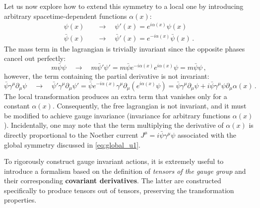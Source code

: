 Let us now explore how to extend this symmetry to a local one by introducing arbitrary spacetime-dependent functions \(\alpha(x)\):
\begin{eqnarray}
    \psi(x) \quad &\rightarrow \quad \psi'(x) = e^{i\alpha(x)}\psi(x) \label{eq:local_u1_psi} \\
    \bar{\psi}(x) \quad &\rightarrow \quad \bar{\psi}'(x) = e^{-i\alpha(x)}\bar{\psi}(x) \, . \label{eq:local_u1_psibar}
\end{eqnarray}
The mass term in the lagrangian is trivially invariant since the opposite phases cancel out perfectly:
\begin{equation} \label{eq:mass_invariance}
    m\bar{\psi}\psi \quad \rightarrow \quad m\bar{\psi}'\psi' = m\bar{\psi}e^{-i\alpha(x)}e^{i\alpha(x)}\psi = m\bar{\psi}\psi \, ,
\end{equation}
however, the term containing the partial derivative is not invariant:
\begin{equation} \label{eq:derivative_noninvariance}
    \bar{\psi}\gamma^\mu\partial_\mu\psi \quad \rightarrow \quad \bar{\psi}'\gamma^\mu\partial_\mu\psi' = \bar{\psi}e^{-i\alpha(x)}\gamma^\mu\partial_\mu(e^{i\alpha(x)}\psi) = \bar{\psi}\gamma^\mu\partial_\mu\psi + i\bar{\psi}\gamma^\mu\psi\partial_\mu\alpha(x) \, .
\end{equation}
The local transformation produces an extra term that vanishes only for a constant \(\alpha(x)\). Consequently, the free lagrangian is not invariant, and it must be modified to achieve gauge invariance (invariance for arbitrary functions \(\alpha(x)\)). Incidentally, one may note that the term multiplying the derivative of \(\alpha(x)\) is directly proportional to the Noether current \(J^\mu = i\bar{\psi}\gamma^\mu\psi\) associated with the global symmetry discussed in \eqref{eq:global_u1}.

To rigorously construct gauge invariant actions, it is extremely useful to introduce a formalism based on the definition of \textit{tensors of the gauge group} and their corresponding \textbf{covariant derivatives}. The latter are constructed specifically to produce tensors out of tensors, preserving the transformation properties.

